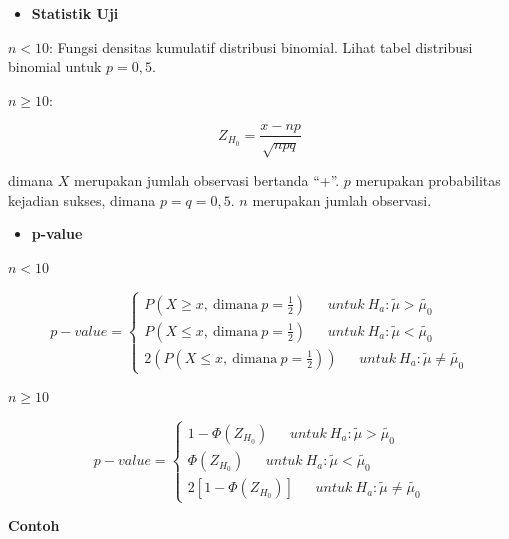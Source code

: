 \documentclass[]{book}
\providecommand{\tightlist}{%
  \setlength{\itemsep}{0pt}\setlength{\parskip}{0pt}}
\begin{document}
\begin{itemize}
\tightlist
\item
  \textbf{Statistik Uji}
\end{itemize}

\textbf{\(n<10\)}: Fungsi densitas kumulatif distribusi binomial. Lihat
tabel distribusi binomial untuk \(p=0,5\).

\textbf{\(n\ge10\)}:

\begin{equation}
Z_{H_0}=\frac{x-np}{\sqrt{npq}}
  \label{eq:signtesteq}
\end{equation}

dimana \(X\) merupakan jumlah observasi bertanda ``+''. \(p\) merupakan
probabilitas kejadian sukses, dimana \(p=q=0,5\). \(n\) merupakan jumlah
observasi.

\begin{itemize}
\tightlist
\item
  \textbf{p-value}
\end{itemize}

\textbf{\(n<10\)}

\begin{equation}
p-value =
  \begin{cases}
    P\left(X\ge x,\ \text{dimana}\ p=\frac{1}{2}\right)\ \ \ \ \ \ \ untuk\ H_a:\tilde{\mu}>\tilde{\mu_0}\\
    P\left(X\le x,\ \text{dimana}\ p=\frac{1}{2}\right)\ \ \ \ \ \ \ untuk\ H_a:\tilde{\mu}<\tilde{\mu_0}\\
    2\left(P\left(X\le x,\ \text{dimana}\ p=\frac{1}{2}\right)\right)\ \ \ \ \ \ \ untuk\ H_a:\tilde{\mu}\ne \tilde{\mu_0}
    \end{cases}
  \label{eq:signtesteq2}
\end{equation}

\textbf{\(n\ge10\)}

\begin{equation}
p-value =
  \begin{cases}
    1-\Phi\left(Z_{H_0}\right)\ \ \ \ \ \ \ untuk\ H_a:\tilde{\mu}>\tilde{\mu_0}\\
    \Phi\left(Z_{H_0}\right)\ \ \ \ \ \ \ untuk\ H_a:\tilde{\mu}<\tilde{\mu_0}\\
    2\left[1-\Phi\left(Z_{H_0}\right)\right]\ \ \ \ \ \ \ untuk\ H_a:\tilde{\mu}\ne \tilde{\mu_0}
    \end{cases}
  \label{eq:signtesteq3}
\end{equation}

\textbf{Contoh}
\end{document}
